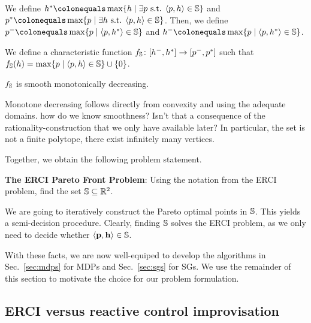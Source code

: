 \begin{definition}
We define 
$\rndopt \colonequals \max \{ \rndp \mid \exists \scp \text{ s.t. } \langle \scp, \rndp \rangle \in \solutions  \} $
and 
$\scopt \colonequals \max \{ \scp \mid \exists \rndp \text{ s.t. } \langle \scp, \rndp \rangle \in \solutions  \} $.
Then, we define 
$\scmin \colonequals \max \{ \scp \mid \langle \scp, \rndopt \rangle  \in \solutions \}$ and $\rndmin \colonequals \max \{ \scp \mid \langle \scp, \rndopt \rangle  \in \solutions \}$.
\end{definition}





We define a characteristic function $f_\mathbb{S}\colon [h^{-},h^{*}] \rightarrow [p^{-},p^{*}]$ such that $f_\mathbb{S}(h) = \max \{ p \mid \langle p, h \rangle \in \mathbb{S} \} \cup \{ 0 \}$.  
\begin{proposition}
	$f_\mathbb{S}$ is smooth monotonically decreasing. 
\end{proposition}
Monotone decreasing follows directly from convexity and using the adequate domains. 
{\color{red}how do we know smoothness? Isn't that a consequence of the rationality-construction that we only have available later?}
In particular, the set is not a finite polytope, there exist infinitely many vertices.


 

Together, we obtain the following problem statement.
\begin{mdframed}[backgroundcolor=white!5]
\textbf{The ERCI Pareto Front Problem}:
Using the notation from the ERCI problem, find the set $\mathbb{S} \subseteq \mathbb{R}^2$.
\end{mdframed}
We are going to iteratively construct the  Pareto optimal points in $\mathbb{S}$. This yields a semi-decision procedure.
Clearly, finding $\mathbb{S}$ solves the ERCI problem, as we only need to decide whether $\langle \mathbf{p}, \mathbf{h} \rangle \in \mathbb{S}$.

With these facts, we are now well-equiped to develop the algorithms in Sec.~\ref{sec:mdps} for MDPs and Sec.~\ref{sec:sgs} for SGs.
We use the remainder of this section to motivate the choice for our problem formulation.

\subsection{ERCI versus reactive control improvisation}

